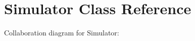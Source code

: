 \hypertarget{class_simulator}{}\section{Simulator Class Reference}
\label{class_simulator}


Collaboration diagram for Simulator\+:
